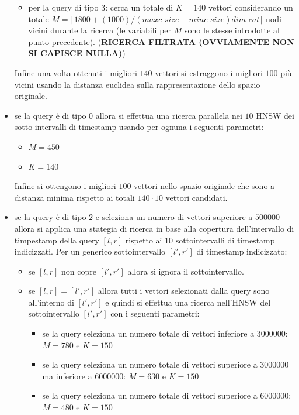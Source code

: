 \begin{itemize}
\begin{itemize}
        \item per la query di tipo $3$: cerca un totale di $K=140$ vettori considerando 
        un totale $M= \lceil1800+(1000)/(maxc\_size - minc\_size)dim\_cat\rceil$ 
        nodi vicini durante la ricerca (le variabili per $M$ sono le stesse introdotte 
        al punto precedente).  (\textbf{RICERCA FILTRATA (OVVIAMENTE NON SI CAPISCE NULLA)})
    \end{itemize} 
    Infine una volta ottenuti i migliori $140$ vettori si estraggono i migliori $100$
    più vicini usando la distanza euclidea sulla rappresentazione dello spazio 
    originale.
    \item se la query è di tipo $0$ allora si effettua una ricerca parallela nei 
    $10$ HNSW dei sotto-intervalli di timestamp usando per ognuna i seguenti parametri:
    \begin{itemize}
        \item $M=450$
        \item $K=140$
    \end{itemize} 
    Infine si ottengono i migliori $100$ vettori nello spazio originale che sono 
    a distanza minima rispetto ai totali $140\cdot 10$ vettori candidati.
    \item se la query è di tipo $2$ e seleziona un numero di vettori 
    superiore a $500000$ allora si applica una stategia di ricerca in base alla 
    copertura dell'intervallo di timpestamp della query $[l,r]$ rispetto ai $10$ sottointervalli
    di timestamp indicizzati. Per un generico sottointervallo $[l',r']$ di timestamp indicizzato:
    \begin{itemize}
        \item se $[l,r]$ non copre $[l',r']$ allora si ignora il sottointervallo.
        \item se $[l,r] = [l',r']$ allora tutti i vettori selezionati dalla query
        sono all'interno di $[l',r']$ e quindi si effettua una ricerca nell'HNSW 
        del sottointervallo $[l',r']$ con i seguenti parametri:
        \begin{itemize}
            \item se la query seleziona un numero totale di vettori inferiore a $3000000$: $M=780$ e $K=150$
            \item se la query seleziona un numero totale di vettori superiore a $3000000$ 
            ma inferiore a  $6000000$: $M=630$ e $K=150$
            \item se la query seleziona un numero totale di vettori superiore a $6000000$: $M=480$ e $K=150$

\end{itemize}
\end{itemize}
\end{itemize}
